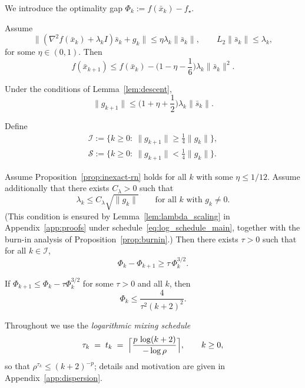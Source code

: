 \documentclass[review,onefignum,onetabnum]{siamart171218}
\begin{document}
We introduce the optimality gap $\Phi_k:=f(\bar x_k)-f_\star$.

\begin{lemma}\label{lem:descent}
Assume
\[
\|(\nabla^2 f(\bar x_k)+\lambda_k I)\bar s_k+g_k\|\le \eta\lambda_k\|\bar s_k\|,
\qquad
L_2\|\bar s_k\|\le \lambda_k,
\]
for some $\eta\in(0,1)$.
Then
\[
f(\bar x_{k+1})\le f(\bar x_k) - \Big(1-\eta-\frac{1}{6}\Big)\lambda_k\|\bar s_k\|^2.
\]
\end{lemma}

\begin{lemma}\label{lem:grad_bound}
Under the conditions of Lemma~\ref{lem:descent},
\[
\|g_{k+1}\|\le \Big(1+\eta+\frac{1}{2}\Big)\lambda_k\|\bar s_k\|.
\]
\end{lemma}

Define
\begin{gather*}
\mathcal I:=\{k\ge0:\ \|g_{k+1}\|\ge \tfrac14\|g_k\|\},\\
\mathcal S:=\{k\ge0:\ \|g_{k+1}\|< \tfrac14\|g_k\|\}.
\end{gather*}

\begin{lemma}\label{lem:steady}
Assume Proposition~\ref{prop:inexact-rn} holds for all $k$ with some $\eta\le 1/12$.
Assume additionally that there exists $C_\lambda>0$ such that
\[
\lambda_k\le C_\lambda\sqrt{\|g_k\|}\qquad\text{for all $k$ with $g_k\neq 0$}.
\]
(This condition is ensured by Lemma~\ref{lem:lambda_scaling}
in Appendix~\ref{app:proofs} under
schedule~\eqref{eq:log_schedule_main}, together with the burn-in
analysis of Proposition~\ref{prop:burnin}.)
Then there exists $\tau>0$ such that for all $k\in\mathcal I$,
\[
\Phi_k-\Phi_{k+1}\ge \tau\,\Phi_k^{3/2}.
\]
\end{lemma}

\begin{lemma}\label{lem:solve32}
If $\Phi_{k+1}\le \Phi_k-\tau\Phi_k^{3/2}$ for some $\tau>0$ and all $k$, then
\[
\Phi_k\le \frac{4}{\tau^2(k+2)^2}.
\]
\end{lemma}

Throughout we use the \emph{logarithmic mixing schedule}
\begin{equation}\label{eq:log_schedule_main}
  \tau_k \;=\; t_k \;=\; \Bigl\lceil \frac{p\,\log(k+2)}{-\log\rho} \Bigr\rceil,
  \qquad k\ge 0,
\end{equation}
so that $\rho^{\tau_k}\le(k+2)^{-p}$; details and motivation are given in
Appendix~\ref{app:dispersion}.
\end{document}
